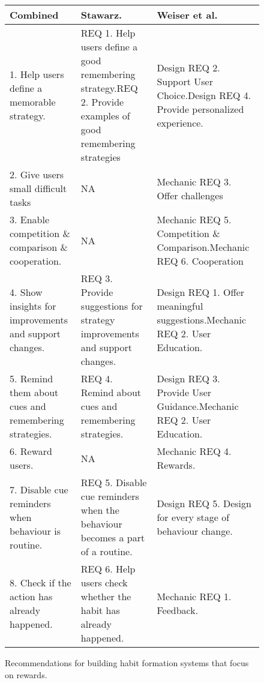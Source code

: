 \begin{landscape}
\renewcommand{\arraystretch}{1.5} %
\begin{figure}[ht] %


\begin{center}
\begin{tabular}{ |p{5.9cm}|p{6.5cm}|p{6.5cm}| }
  \hline
  \textbf{Combined} & \textbf{Stawarz.~\cite{thesis_kathy}} & \textbf{Weiser et al.~\cite{article_taxonomy_motivational_affordances_meaningful}} \\ \hline %
  1. Help users define a memorable strategy. & REQ 1. Help users define a good remembering strategy.\newline REQ 2. Provide examples of good remembering strategies & Design REQ 2. Support User Choice.\newline Design REQ 4. Provide personalized experience. \\ \hline
  2. Give users small difficult tasks & N\/A & Mechanic REQ 3. Offer challenges\\ \hline
  3. Enable competition \& comparison \& cooperation. & N\/A & Mechanic REQ 5. Competition \& Comparison.\newline Mechanic REQ 6. Cooperation\\ \hline
  4. Show insights for improvements and support changes. & REQ 3. Provide suggestions for strategy improvements and support changes. & Design REQ 1. Offer meaningful suggestions.\newline Mechanic REQ 2. User Education. \\ \hline
  5. Remind them about cues and remembering strategies. & REQ 4. Remind about cues and remembering strategies. & Design REQ 3. Provide User Guidance.\newline Mechanic REQ 2. User Education. \\ \hline
  6. Reward users. & N\/A & Mechanic REQ 4. Rewards. \\ \hline
  7. Disable cue reminders when behaviour is routine. & REQ 5. Disable cue reminders when the behaviour becomes a part of a routine. & Design REQ 5. Design for every stage of behaviour change. \\ \hline
  8. Check if the action has already happened. & REQ 6. Help users check whether the habit has already happened. & Mechanic REQ 1. Feedback. \\ \hline
\end{tabular}
\end{center}

    \caption{Recommendations for building habit formation systems that focus on rewards.}
    \label{fig:reqtable}
\end{figure}
\newpage
\end{landscape}

